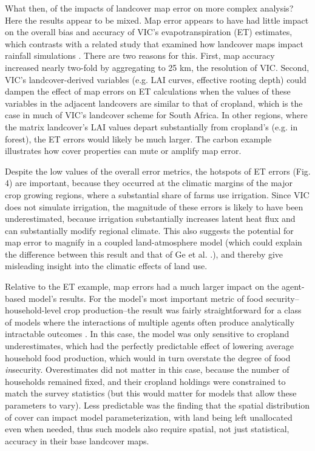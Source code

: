 \documentclass{pnastwo}
\begin{document}
\begin{article}
What then, of the impacts of landcover map error on more complex analysis?  Here the results appear to be mixed. Map error appears to have had little impact on the overall bias and accuracy of VIC's evapotranspiration (ET) estimates, which contrasts with a related study that examined how landcover maps impact rainfall simulations \cite{ge_impacts_2007}. There are two reasons for this. First, map accuracy increased nearly two-fold by aggregating to 25 km, the resolution of VIC. Second, VIC's landcover-derived variables (e.g. LAI curves, effective rooting depth) could dampen the effect of map errors on ET calculations when the values of these variables in the adjacent landcovers are similar to that of cropland, which is the case in much of VIC's landcover scheme for South Africa. In other regions, where the matrix landcover's LAI values depart substantially from cropland's (e.g. in forest), the ET errors would likely be much larger. The carbon example illustrates how cover properties can mute or amplify map error.  

Despite the low values of the overall error metrics, the hotspots of ET errors (Fig. 4) are important, because they occurred at the climatic margins of the major crop growing regions, where a substantial share of farms use irrigation. Since VIC does not simulate irrigation, the magnitude of these errors is likely to have been underestimated, because irrigation substantially increases latent heat flux and can substantially modify regional climate\cite{sacks_effects_2008,mueller_cooling_2015}. This also suggests the potential for map error to magnify in a coupled land-atmosphere model (which could explain the difference between this result and that of Ge et al. \cite{ge_impacts_2007}.), and thereby give misleading insight into the climatic effects of land use.     

Relative to the ET example, map errors had a much larger impact on the agent-based model's results. For the model's most important metric of food security--household-level crop production--the result was fairly straightforward for a class of models where the interactions of multiple agents often produce analytically intractable outcomes \cite{janssen_empirically_2006}. In this case, the model was only sensitive to cropland underestimates, which had the perfectly predictable effect of lowering average household food production, which would in turn overstate the degree of food \emph{in}security. Overestimates did not matter in this case, because the number of households remained fixed, and their cropland holdings were constrained to match the survey statistics (but this would matter for models that allow these parameters to vary). Less predictable was the finding that the spatial distribution of cover can impact model parameterization, with land being left unallocated even when needed, thus such models also require spatial, not just statistical, accuracy in their base landcover maps.  


\end{article}
\end{document}
